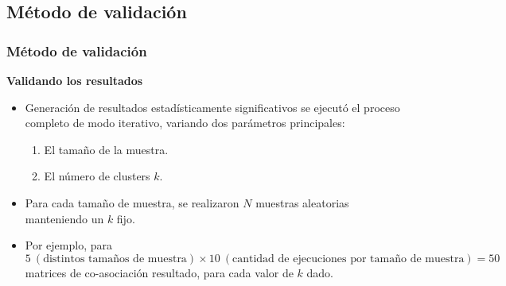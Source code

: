 \subsection{Método de validación}
\begin{frame}
	\frametitle{Método de validación}
	\textbf{Validando los resultados}
	\bigskip
	\begin{itemize}
		\item Generación de resultados estadísticamente significativos se ejecutó el proceso completo de modo iterativo, variando dos parámetros principales: \begin{enumerate}[<*>] \item El tamaño de la muestra. \item El número de clusters \(k\). \end{enumerate}
		\item Para cada tamaño de muestra, se realizaron \(N\) muestras aleatorias manteniendo un \(k\) fijo.
		\item Por ejemplo, para \(5 \: (\text{distintos tamaños de muestra}) \times 10 \: (\text{cantidad de ejecuciones por tamaño de muestra}) = 50\) matrices de co-asociación resultado, para cada valor de \(k\) dado.
	\end{itemize}
\end{frame}

